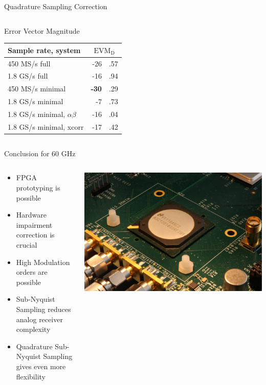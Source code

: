 \documentclass[10pt]{beamer}
\newcommand{\mc}[2]{\multicolumn{#1}{c|}{#2}}
\begin{document}
\begin{frame}{Quadrature Sampling Correction}
\begin{columns}[T]
\begin{column}{.5\textwidth}
{\begin{block}{Error Vector Magnitude}
          \begin{tabular}{|l|r@{}l|}
            \hline
            Sample rate, system             & \mc{2}{$\text{EVM}_\text{D}$} \\ \hline
            450 MS/s full                   & -26&.57      \\ \hline
            1.8 GS/s full                   & -16&.94      \\ \hline
            450 MS/s minimal                & {\bf-30}&.29 \\ \hline
            1.8 GS/s minimal                & -7&.73       \\ \hline
            1.8 GS/s minimal, $\alpha\beta$ & -16&.04      \\ \hline
            1.8 GS/s minimal, xcorr         & -17&.42      \\ \hline
          \end{tabular}
        \end{block}
      }
    \end{column}
  \end{columns}
\end{frame}

\begin{frame}{Conclusion for 60 GHz}
  \begin{columns}[T]
    \begin{column}{.6\textwidth}
      \begin{itemize}
      \item FPGA prototyping is possible
      \item Hardware impairment correction is crucial
      \item High Modulation orders are possible
      \item Sub-Nyquist Sampling reduces analog receiver complexity
      \item Quadrature Sub-Nyquist Sampling gives even more flexibility
      \end{itemize}
    \end{column}
    \begin{column}{.4\textwidth}
      \includegraphics[width=\textwidth]{pictures/adc}
    \end{column}
  \end{columns}
\end{frame}
\end{document}
